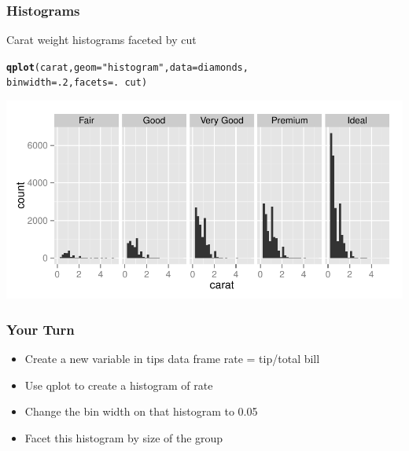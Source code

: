 \documentclass{beamer}\usepackage[]{graphicx}\usepackage[]{color}
\makeatletter
\newcommand{\hlnum}[1]{\textcolor[rgb]{0.686,0.059,0.569}{#1}}%
\newcommand{\hlstr}[1]{\textcolor[rgb]{0.192,0.494,0.8}{#1}}%
\newcommand{\hlopt}[1]{\textcolor[rgb]{0,0,0}{#1}}%
\newcommand{\hlstd}[1]{\textcolor[rgb]{0.345,0.345,0.345}{#1}}%
\newcommand{\hlkwc}[1]{\textcolor[rgb]{0.333,0.667,0.333}{#1}}%
\newcommand{\hlkwd}[1]{\textcolor[rgb]{0.737,0.353,0.396}{\textbf{#1}}}%
\newenvironment{kframe}{%
 \def\at@end@of@kframe{}%
 \ifinner\ifhmode%
  \def\at@end@of@kframe{\end{minipage}}%
  \begin{minipage}{\columnwidth}%
 \fi\fi%
 \def\FrameCommand##1{\hskip\@totalleftmargin \hskip-\fboxsep
 \colorbox{shadecolor}{##1}\hskip-\fboxsep
     \hskip-\linewidth \hskip-\@totalleftmargin \hskip\columnwidth}%
 \MakeFramed {\advance\hsize-\width
   \@totalleftmargin\z@ \linewidth\hsize
   \@setminipage}}%
 {\par\unskip\endMakeFramed%
 \at@end@of@kframe}
\newenvironment{knitrout}{}{} %
\makeatother
\begin{document}
\begin{frame}[fragile]
\frametitle{Histograms}
    
Carat weight histograms faceted by cut
    
\footnotesize
\begin{knitrout}\footnotesize
{}\color{fgcolor}\begin{kframe}
\begin{alltt}
\hlkwd{qplot}\hlstd{(carat,} \hlkwc{geom}\hlstd{=}\hlstr{"histogram"}\hlstd{,} \hlkwc{data}\hlstd{=diamonds,}
                        \hlkwc{binwidth}\hlstd{=}\hlnum{.2}\hlstd{,} \hlkwc{facets}\hlstd{=.}\hlopt{~}\hlstd{cut )}
\end{alltt}
\end{kframe}

{\centering \includegraphics[width=.9\linewidth]{figure/kdiamondhist2} 

}



\end{knitrout}
\normalsize
\end{frame}


\begin{frame}
\frametitle{Your Turn}

\begin{itemize}
  \item Create a new variable in tips data frame rate = tip/total bill\medskip
  \item Use qplot to create a histogram of rate\medskip
  \item Change the bin width on that histogram to 0.05\medskip
  \item Facet this histogram by size of the group
\end{itemize}

\end{frame}
\end{document}
